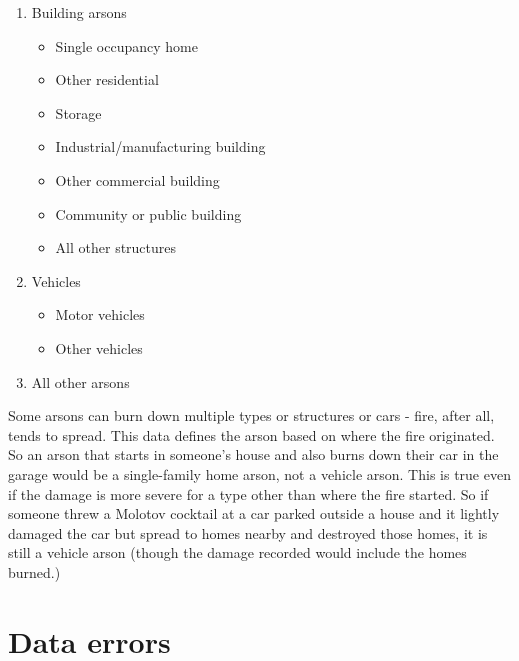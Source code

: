 \documentclass[
  12pt,
  openany]{book}
\providecommand{\tightlist}{%
  \setlength{\itemsep}{0pt}\setlength{\parskip}{0pt}}
\begin{document}
\begin{enumerate}
\def\labelenumi{\arabic{enumi}.}
\tightlist
\item
  Building arsons

  \begin{itemize}
  \tightlist
  \item
    Single occupancy home
  \item
    Other residential
  \item
    Storage
  \item
    Industrial/manufacturing building
  \item
    Other commercial building
  \item
    Community or public building
  \item
    All other structures
  \end{itemize}
\item
  Vehicles

  \begin{itemize}
  \tightlist
  \item
    Motor vehicles
  \item
    Other vehicles
  \end{itemize}
\item
  All other arsons
\end{enumerate}

Some arsons can burn down multiple types or structures or cars - fire, after all, tends to spread. This data defines the arson based on where the fire originated. So an arson that starts in someone's house and also burns down their car in the garage would be a single-family home arson, not a vehicle arson. This is true even if the damage is more severe for a type other than where the fire started. So if someone threw a Molotov cocktail at a car parked outside a house and it lightly damaged the car but spread to homes nearby and destroyed those homes, it is still a vehicle arson (though the damage recorded would include the homes burned.)

\hypertarget{data-errors}{%
\section{Data errors}\label{data-errors}}
\end{document}
